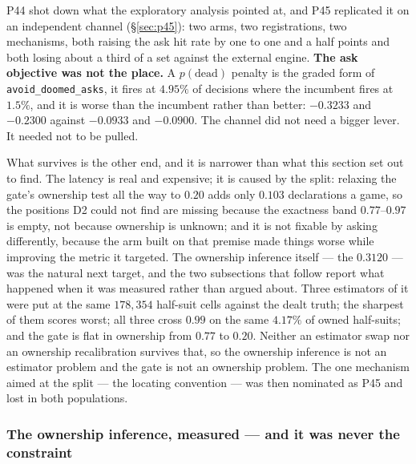 \documentclass[11pt,letterpaper]{article}
\begin{document}
P44 shot down what the exploratory analysis pointed at, and P45 replicated
it on an independent channel (\S\ref{sec:p45}): two arms, two registrations,
two mechanisms, both raising the ask hit rate by one to one and a half points
and both losing about a third of a set against the external engine.
\textbf{The ask objective was not the place.} A $p(\text{dead})$ penalty is the graded form of
\texttt{avoid\_doomed\_asks}, it fires at $4.95\%$ of decisions where the
incumbent fires at $1.5\%$, and it is worse than the incumbent rather than
better: $-0.3233$ and $-0.2300$ against $-0.0933$ and $-0.0900$. The channel
did not need a bigger lever. It needed not to be pulled.

What survives is the other end, and it is narrower than what this section set
out to find. The latency is real and expensive; it is caused by the split:
relaxing the gate's ownership test all the way to $0.20$ adds only $0.103$
declarations a game, so the positions D2 could not find are missing because
the exactness band $0.77$--$0.97$ is empty, not because ownership is unknown;
and it is not fixable by asking differently, because the arm built on that
premise made things worse while improving the metric it targeted. The
ownership inference itself --- the $0.3120$ --- was the natural next target,
and the two subsections that follow report what happened when it was measured
rather than argued about. Three estimators of it were put at the same
$178{,}354$ half-suit cells against the dealt truth; the sharpest of them
scores worst; all three cross $0.99$ on the same $4.17\%$ of owned
half-suits; and the gate is flat in ownership from $0.77$ to $0.20$. Neither
an estimator swap nor an ownership recalibration survives that, so the
ownership inference is not an estimator problem and the gate is not an
ownership problem. The one mechanism aimed at the split --- the locating
convention --- was then nominated as P45 and lost in both populations.

\subsubsection{The ownership inference, measured --- and it was never the
constraint}
\label{sec:ownership-closure}
\end{document}
